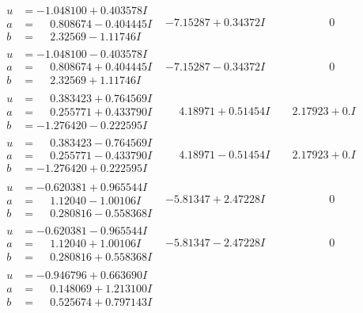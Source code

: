 \documentclass[1p]{elsarticle_modified}
\theoremstyle{definition}
\begin{document}
$$\begin{array}{c|c|c}
\begin{aligned}
u &= -1.048100 + 0.403578 I \\
a &= \phantom{-}0.808674 - 0.404445 I \\
b &= \phantom{-}2.32569 - 1.11746 I\end{aligned}
 & -7.15287 + 0.34372 I & \phantom{-0.000000 } 0 \\ \hline\begin{aligned}
u &= -1.048100 - 0.403578 I \\
a &= \phantom{-}0.808674 + 0.404445 I \\
b &= \phantom{-}2.32569 + 1.11746 I\end{aligned}
 & -7.15287 - 0.34372 I & \phantom{-0.000000 } 0 \\ \hline\begin{aligned}
u &= \phantom{-}0.383423 + 0.764569 I \\
a &= \phantom{-}0.255771 + 0.433790 I \\
b &= -1.276420 - 0.222595 I\end{aligned}
 & \phantom{-}4.18971 + 0.51454 I & \phantom{-}2.17923 + 0. I\phantom{ +0.000000I} \\ \hline\begin{aligned}
u &= \phantom{-}0.383423 - 0.764569 I \\
a &= \phantom{-}0.255771 - 0.433790 I \\
b &= -1.276420 + 0.222595 I\end{aligned}
 & \phantom{-}4.18971 - 0.51454 I & \phantom{-}2.17923 + 0. I\phantom{ +0.000000I} \\ \hline\begin{aligned}
u &= -0.620381 + 0.965544 I \\
a &= \phantom{-}1.12040 - 1.00106 I \\
b &= \phantom{-}0.280816 - 0.558368 I\end{aligned}
 & -5.81347 + 2.47228 I & \phantom{-0.000000 } 0 \\ \hline\begin{aligned}
u &= -0.620381 - 0.965544 I \\
a &= \phantom{-}1.12040 + 1.00106 I \\
b &= \phantom{-}0.280816 + 0.558368 I\end{aligned}
 & -5.81347 - 2.47228 I & \phantom{-0.000000 } 0 \\ \hline\begin{aligned}
u &= -0.946796 + 0.663690 I \\
a &= \phantom{-}0.148069 + 1.213100 I \\
b &= \phantom{-}0.525674 + 0.797143 I\end{aligned}

\end{array}$$
\end{document}
